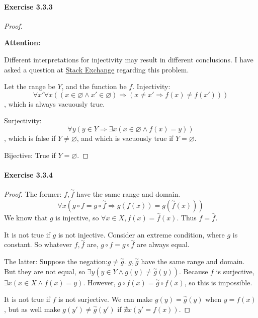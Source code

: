 \paragraph{Exercise 3.3.3} \label{exercise3.3.3}
\begin{proof}
\begin{large}
\textbf{Attention:}
\end{large}
Different interpretations for injectivity may result in different conclusions. 
I have asked a question at 
\href{https://math.stackexchange.com/questions/3800240/how-to-interpret-the-definition-of-injectivity}{Stack Exchange} regarding this problem.

Let the range be $Y$, and the function be $f$.
Injectivity:
\[
\forall x'\forall x((x \in \varnothing \wedge x' \in \varnothing) \Longrightarrow
(x \neq x' \Longrightarrow f(x) \neq f(x')))
\], 
which is always vacuously true.

Surjectivity:
\[
\forall y(y \in Y \Longrightarrow \exists x(x \in \varnothing \wedge f(x) = y))
\], 
which is false if $Y \neq \varnothing$, and which is vacuously true if $Y = \varnothing$.

Bijective: True if $Y = \varnothing$.
\end{proof}

\paragraph{Exercise 3.3.4} \label{exercise3.3.4}
\begin{proof}
The former: $f,\overset{\sim}{f}$ have the same range and domain. 
\[
\forall x(g \circ f = g \circ \overset{\sim}{f} \Longrightarrow g(f(x)) = g(\overset{\sim}{f}(x)))
\]
We know that $g$ is injective, so $\forall x \in X, f(x) = \overset{\sim}{f}(x)$. Thus 
$f = \overset{\sim}{f}$.

It is not true if $g$ is not injective. Consider an extreme condition, where $g$ is constant. So 
whatever $f,\overset{\sim}{f}$ are, $g \circ f = g \circ \overset{\sim}{f}$ are always equal.

The latter: Suppose the negation:$g \neq \overset{\sim}{g}$.
$g,\overset{\sim}{g}$ have the same range and domain. But they are not equal, so 
$\exists y(y \in Y \wedge g(y) \neq \overset{\sim}{g}(y))$. Because $f$ is surjective, 
$\exists x(x \in X \wedge f(x) = y)$. However, $g \circ f(x) = \overset{\sim}{g} \circ f(x)$, so 
this is impossible.

It is not true if $f$ is not surjective. We can make $g(y) = \overset{\sim}{g}(y)$ when $y=f(x)$, but 
as well make $g(y') \neq \overset{\sim}{g}(y')$ if $\nexists x(y'=f(x))$.
\end{proof}

